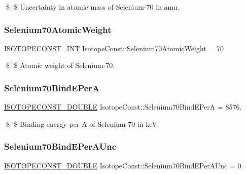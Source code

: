 \$ \$ Uncertainty in atomic mass of Selenium-\/70 in amu. \mbox{\label{group___isotope_const-_selenium-_se70_ga7d5321855cde082ef5ea2696592902a9}} 
\subsubsection{\texorpdfstring{Selenium70\+Atomic\+Weight}{Selenium70AtomicWeight}}
{\footnotesize\ttfamily \mbox{\hyperlink{group___isotope_const-_macros_ga5f18360b3e99483a35c32d789e62621c}{I\+S\+O\+T\+O\+P\+E\+C\+O\+N\+S\+T\+\_\+\+I\+NT}} Isotope\+Const\+::\+Selenium70\+Atomic\+Weight = 70}

\$ \$ Atomic weight of Selenium-\/70. \mbox{\label{group___isotope_const-_selenium-_se70_ga290ef0a38d440f1597aa7a22c9eb047c}} 
\subsubsection{\texorpdfstring{Selenium70\+Bind\+E\+PerA}{Selenium70BindEPerA}}
{\footnotesize\ttfamily \mbox{\hyperlink{group___isotope_const-_macros_ga8f45a7272ce02c0b4c65c44636ed719a}{I\+S\+O\+T\+O\+P\+E\+C\+O\+N\+S\+T\+\_\+\+D\+O\+U\+B\+LE}} Isotope\+Const\+::\+Selenium70\+Bind\+E\+PerA = 8576.}

\$ \$ Binding energy per A of Selenium-\/70 in keV. \mbox{\label{group___isotope_const-_selenium-_se70_gaa7debb5e224e04f6e89aff36549b16fd}} 
\subsubsection{\texorpdfstring{Selenium70\+Bind\+E\+Per\+A\+Unc}{Selenium70BindEPerAUnc}}
{\footnotesize\ttfamily \mbox{\hyperlink{group___isotope_const-_macros_ga8f45a7272ce02c0b4c65c44636ed719a}{I\+S\+O\+T\+O\+P\+E\+C\+O\+N\+S\+T\+\_\+\+D\+O\+U\+B\+LE}} Isotope\+Const\+::\+Selenium70\+Bind\+E\+Per\+A\+Unc = 0.}

